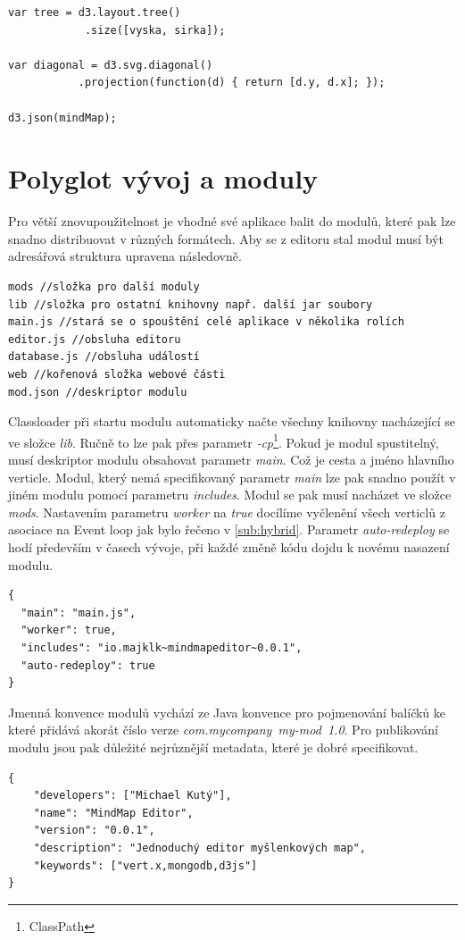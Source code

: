 \begin{lstlisting}[caption=D3.js nicializace dat]
var tree = d3.layout.tree()
		    .size([vyska, sirka]);

var diagonal = d3.svg.diagonal()
		   .projection(function(d) { return [d.y, d.x]; });
		   
d3.json(mindMap);
\end{lstlisting}


\section{Polyglot vývoj a moduly}\label{sec:praktickyModuly}

Pro větší znovupoužitelnost je vhodné své aplikace balit do modulů, které pak lze snadno distribuovat v různých formátech. Aby se z editoru stal modul musí být adresářová struktura upravena následovně.

\begin{lstlisting}
mods //složka pro další moduly
lib //složka pro ostatní knihovny např. další jar soubory
main.js //stará se o spouštění celé aplikace v několika rolích
editor.js //obsluha editoru
database.js //obsluha událostí 
web //kořenová složka webové části
mod.json //deskriptor modulu
\end{lstlisting}

Classloader při startu modulu automaticky načte všechny knihovny nacházející se ve složce \emph{lib}. Ručně to lze pak přes parametr \emph{-cp}\footnote{ClassPath}. Pokud je modul spustitelný, musí deskriptor modulu obsahovat parametr \emph{main}. Což je cesta a jméno hlavního verticle. Modul, který nemá specifikovaný parametr \emph{main} lze pak snadno použít v jiném modulu pomocí parametru \emph{includes}. Modul se pak musí nacházet ve složce \emph{mods}. Nastavením parametru \emph{worker} na \emph{true} docílíme vyčlenění všech verticlů z asociace na Event loop jak bylo řečeno v \ref{sub:hybrid}. Parametr \emph{auto-redeploy} se hodí především v časech vývoje, při každé změně kódu dojdu k novému nasazení modulu. 
\begin{lstlisting}
{
  "main": "main.js",
  "worker": true,
  "includes": "io.majklk~mindmapeditor~0.0.1",
  "auto-redeploy": true
}
\end{lstlisting}

Jmenná konvence modulů vychází ze Java konvence\cite{javaPKG} pro pojmenování balíčků ke které přidává akorát číslo verze \emph{com.mycompany~my-mod~1.0}.
Pro publikování modulu jsou pak důležité nejrůznější metadata, které je dobré specifikovat.
\begin{lstlisting}
{
	"developers": ["Michael Kutý"],
	"name": "MindMap Editor",
	"version": "0.0.1",
	"description": "Jednoduchý editor myšlenkových map",
	"keywords": ["vert.x,mongodb,d3js"]
}  
\end{lstlisting}

